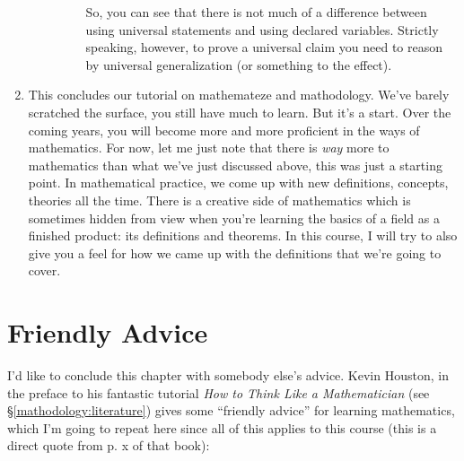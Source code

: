 \begin{enumerate}[{\thesection}.1]
\begin{description}
\begin{itemize}
					So, you can see that there is not much of a difference between using universal statements and using declared variables. Strictly speaking, however, to prove a universal claim you need to reason by universal generalization (or something to the effect). 
					
				\end{itemize}
			
		
		\end{description}
		
		\item This concludes our tutorial on mathemateze and mathodology. We've barely scratched the surface, you still have much to learn. But it's a start. Over the coming years, you will become more and more proficient in the ways of mathematics. For now, let me just note that there is \emph{way} more to mathematics than what we've just discussed above, this was just a starting point. In mathematical practice, we come up with new definitions, concepts, theories all the time. There is a creative side of mathematics which is sometimes hidden from view when you're learning the basics of a field as a finished product: its definitions and theorems. In this course, I will try to also give you a feel for how we came up with the definitions that we're going to cover.
				
\end{enumerate}

\section{Friendly Advice}

I'd like to conclude this chapter with somebody else's advice. Kevin Houston, in the preface to his fantastic tutorial \emph{How to Think Like a Mathematician} (see \S\ref{mathodology:literature}) gives some ``friendly advice'' for learning mathematics, which I'm going to repeat here since all of this applies to this course (this is a direct quote from p. x of that book):
		
